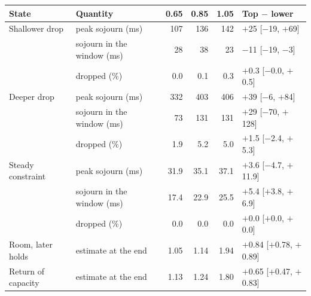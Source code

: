\begin{tabular}{llrrrl}
\toprule
State & Quantity & 0.65 & 0.85 & 1.05 & Top $-$ lower \\
\midrule
Shallower drop & peak sojourn (ms) & 107 & 136 & 142 & $+$25 [$-$19, $+$69] \\
 & sojourn in the window (ms) & 28 & 38 & 23 & $-$11 [$-$19, $-$3] \\
 & dropped (\%) & 0.0 & 0.1 & 0.3 & $+$0.3 [$-$0.0, $+$0.5] \\
Deeper drop & peak sojourn (ms) & 332 & 403 & 406 & $+$39 [$-$6, $+$84] \\
 & sojourn in the window (ms) & 73 & 131 & 131 & $+$29 [$-$70, $+$128] \\
 & dropped (\%) & 1.9 & 5.2 & 5.0 & $+$1.5 [$-$2.4, $+$5.3] \\
Steady constraint & peak sojourn (ms) & 31.9 & 35.1 & 37.1 & $+$3.6 [$-$4.7, $+$11.9] \\
 & sojourn in the window (ms) & 17.4 & 22.9 & 25.5 & $+$5.4 [$+$3.8, $+$6.9] \\
 & dropped (\%) & 0.0 & 0.0 & 0.0 & $+$0.0 [$+$0.0, $+$0.0] \\
\midrule
Room, later holds & estimate at the end & 1.05 & 1.14 & 1.94 & $+$0.84 [$+$0.78, $+$0.89] \\
Return of capacity & estimate at the end & 1.13 & 1.24 & 1.80 & $+$0.65 [$+$0.47, $+$0.83] \\
\bottomrule
\end{tabular}
